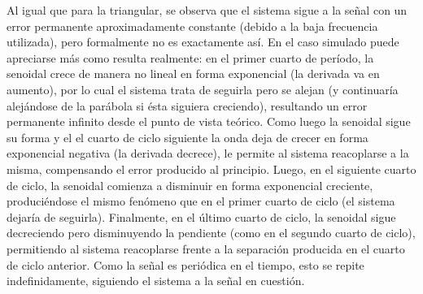 \documentclass{article}
\begin{document}
Al igual que para la triangular, se observa que el sistema sigue a la señal con un error permanente aproximadamente constante (debido a la baja frecuencia utilizada), pero formalmente no es exactamente así. En el caso simulado puede apreciarse más como resulta realmente: en el primer cuarto de período, la senoidal crece de manera no lineal en forma exponencial (la derivada va en aumento), por lo cual el sistema trata de seguirla pero se alejan (y continuaría alejándose de la parábola si ésta siguiera creciendo), resultando un error permanente infinito desde el punto de vista teórico. Como luego la senoidal sigue su forma y el el cuarto de ciclo siguiente la onda deja de crecer en forma exponencial negativa (la derivada decrece), le permite al sistema reacoplarse a la misma, compensando el error producido al principio. Luego, en el siguiente cuarto de ciclo, la senoidal comienza a disminuir en forma exponencial creciente, produciéndose el mismo fenómeno que en el primer cuarto de ciclo (el sistema dejaría de seguirla). Finalmente, en el último cuarto de ciclo, la senoidal sigue decreciendo pero disminuyendo la pendiente (como en el segundo cuarto de ciclo), permitiendo al sistema reacoplarse frente a la separación producida en el cuarto de ciclo anterior. Como la señal es periódica en el tiempo, esto se repite indefinidamente, siguiendo el sistema a la señal en cuestión.
\end{document}
